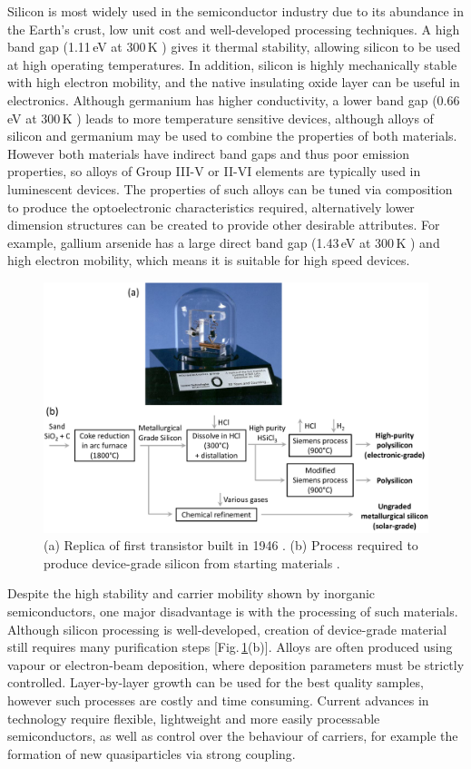 Silicon is most widely used in the semiconductor industry due to its abundance in the Earth's crust, low unit cost and well-developed processing techniques. A high band gap (1.11\,eV at 300\,K \cite{Kittel1986}) gives it thermal stability, allowing silicon to be used at high operating temperatures. In addition, silicon is highly mechanically stable with high electron mobility, and the native insulating oxide layer can be useful in electronics. Although germanium has higher conductivity, a lower band gap (0.66\,eV at 300\,K \cite{Kittel1986}) leads to more temperature sensitive devices, although alloys of silicon and germanium may be used to combine the properties of both materials. However both materials have indirect band gaps and thus poor emission properties, so alloys of Group III-V or II-VI elements are typically used in luminescent devices. The properties of such alloys can be tuned via composition to produce the optoelectronic characteristics required, alternatively lower dimension structures can be created to provide other desirable attributes. For example, gallium arsenide has a large direct band gap (1.43\,eV at 300\,K \cite{Kittel1986}) and high electron mobility, which means it is suitable for high speed devices.
\begin{figure}[h!]
\centering
\includegraphics[width=\textwidth]{Fig1}
\caption{(a) Replica of first transistor built in 1946 \cite{Transistor}. (b) Process required to produce device-grade silicon from starting materials \cite{Silicon}.}
\label{1Fig1}
\end{figure}

Despite the high stability and carrier mobility shown by inorganic semiconductors, one major disadvantage is with the processing of such materials. Although silicon processing is well-developed, creation of device-grade material still requires many purification steps [Fig.\,\ref{1Fig1}(b)]. Alloys are often produced using vapour or electron-beam deposition, where deposition parameters must be strictly controlled. Layer-by-layer growth can be used for the best quality samples, however such processes are costly and time consuming. Current advances in technology require flexible, lightweight and more easily processable semiconductors, as well as control over the behaviour of carriers, for example the formation of new quasiparticles via strong coupling.

